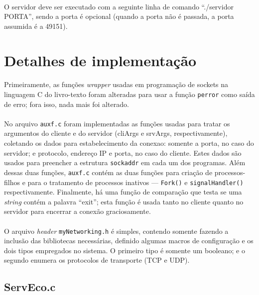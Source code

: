 \documentclass[a4paper,10pt,oneside,final,titlepage,onecolumn]{article}
\begin{document}
\paragraph{}O servidor deve ser executado com a seguinte linha de comando ``./servidor PORTA'', sendo a porta é opcional (quando a porta não é passada, a porta assumida é a 49151).



\FloatBarrier
\section{Detalhes de implementação}
\paragraph{}Primeiramente, as funções \emph{wrapper} usadas em programação de sockets na linguagem C do livro-texto foram alteradas para usar a função \verb|perror| como saída de erro; fora isso, nada mais foi alterado.
\paragraph{}No arquivo \verb|auxf.c| foram implementadas as funções usadas para tratar os argumentos do cliente e do servidor (cliArgs e srvArgs, respectivamente), coletando os dados para estabelecimento da conexao: somente a porta, no caso do servidor; e protocolo, endereço IP e porta, no caso do cliente. Estes dados são usados para preencher a estrutura \verb|sockaddr| em cada um dos programas. Além dessas duas funções, \verb|auxf.c| contém as duas funções para criação de processos-filhos e para o tratamento de processos inativos --- \verb|Fork()| e \verb|signalHandler()| respectivamente. Finalmente, há uma função de comparação que testa se uma \emph{string} contém a palavra ``exit''; esta função é usada tanto no cliente quanto no servidor para encerrar a conexão graciosamente.
\paragraph{}O arquivo \emph{header} \verb|myNetworking.h| é simples, contendo somente fazendo a inclusão das bibliotecas necessárias, definido algumas macros de configuração e os dois tipos empregados no sistema. O primeiro tipo é somente um booleano; e o segundo enumera os protocolos de transporte (TCP e UDP).
\subsection{ServEco.c}
\end{document}
